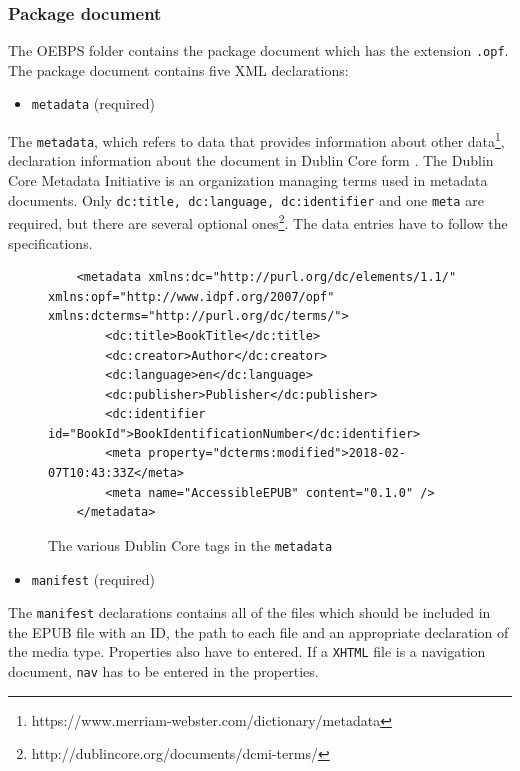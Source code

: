 \subsubsection{Package document}

The OEBPS folder contains the package document which has the extension \lstinline{.opf}. The package document contains five XML declarations:

\begin{itemize}
	 \item \lstinline|metadata| (required)
\end{itemize}


The \lstinline{metadata}, which refers to data that provides information about other data\footnote{https://www.merriam-webster.com/dictionary/metadata}, declaration information about the document in Dublin Core form \cite{dublinCore}. The Dublin Core Metadata Initiative is an organization managing terms used in metadata documents. Only \lstinline{dc:title, dc:language, dc:identifier} and one \lstinline{meta} are required, but there are several optional ones\footnote{http://dublincore.org/documents/dcmi-terms/}. The data entries have to follow the specifications. 

\begin{figure}
	\begin{lstlisting}
	<metadata xmlns:dc="http://purl.org/dc/elements/1.1/" xmlns:opf="http://www.idpf.org/2007/opf" xmlns:dcterms="http://purl.org/dc/terms/">
		<dc:title>BookTitle</dc:title>
		<dc:creator>Author</dc:creator>
		<dc:language>en</dc:language>
		<dc:publisher>Publisher</dc:publisher>
		<dc:identifier id="BookId">BookIdentificationNumber</dc:identifier>
		<meta property="dcterms:modified">2018-02-07T10:43:33Z</meta>
		<meta name="AccessibleEPUB" content="0.1.0" />
	</metadata>
	\end{lstlisting}
	\caption{The various Dublin Core tags in the \lstinline{metadata}}
	\label{fig:metadata}
\end{figure}

\begin{itemize}
	\item \lstinline{manifest} (required)
\end{itemize}

The \lstinline{manifest} declarations contains all of the files which should be included in the EPUB file with an ID, the path to each file and an appropriate declaration of the media type.  Properties also have to entered. If a \lstinline{XHTML} file is a navigation document, \lstinline{nav} has to be entered in the properties.

